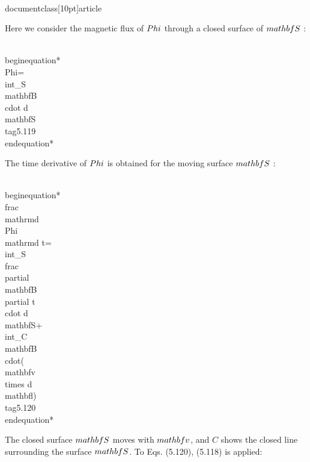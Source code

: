 \\documentclass[10pt]{article}
\begin{document}
{{{{Here we consider the magnetic flux of $\\Phi$ through a closed surface of $\\mathbf{S}$ :


\\begin{equation*}
\\Phi=\\int_{S} \\mathbf{B} \\cdot d \\mathbf{S} \\tag{5.119}
\\end{equation*}


The time derivative of $\\Phi$ is obtained for the moving surface $\\mathbf{S}$ :


\\begin{equation*}
\\frac{\\mathrm{d} \\Phi}{\\mathrm{d} t}=\\int_{S} \\frac{\\partial \\mathbf{B}}{\\partial t} \\cdot d \\mathbf{S}+\\int_{C} \\mathbf{B} \\cdot(\\mathbf{v} \\times d \\mathbf{l}) \\tag{5.120}
\\end{equation*}


The closed surface $\\mathbf{S}$ moves with $\\mathbf{v}$, and $C$ shows the closed line surrounding the surface $\\mathbf{S}$. To Eqs. (5.120), (5.118) is applied:


}}}}
\end{document}
